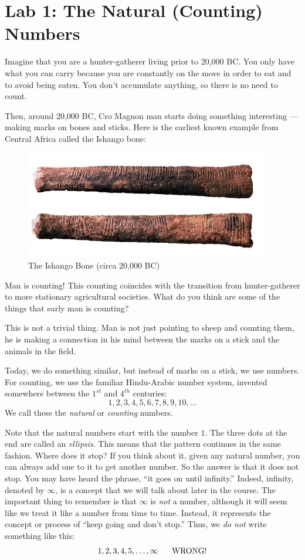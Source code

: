 \documentclass[letterpaper,12pt,fleqn]{article}
\begin{document}
\section*{Lab 1: The Natural (Counting) Numbers}

Imagine that you are a hunter-gatherer living prior to 20,000 BC. You only have what you
can carry because you are constantly on the move in order to eat and to avoid being
eaten. You don't accumulate anything, so there is no need to count.

Then, around 20,000 BC, Cro Magnon man starts doing something interesting --- making
marks on bones and sticks. Here is the earliest known example from Central Africa called
the Ishango bone:

\begin{figure}[h]
  \centering
  \includegraphics{ishango_bone.jpg}
  \caption*{The Ishango Bone (circa 20,000 BC)}
\end{figure}

Man is counting! This counting coincides with the transition from hunter-gatherer to more
stationary agricultural societies.  What do you think are some of the things that early
man is counting?

This is not a trivial thing. Man is not just pointing to sheep and counting them, he is
making a connection in his mind between the marks on a stick and the animals in the
field.

Today, we do something similar, but instead of marks on a stick, we use numbers. For
counting, we use the familiar Hindu-Arabic number system, invented somewhere between the
$1^{st}$ and $4^{th}$ centuries:
\[1, 2, 3, 4, 5, 6, 7, 8, 9, 10, \ldots\]
We call these the \emph{natural} or \emph{counting} numbers.

Note that the natural numbers start with the number $1$. The three dots at the end are
called an \emph{ellipsis}. This means that the pattern continues in the same fashion.
Where does it stop? If you think about it, given any natural number, you can always add
one to it to get another number. So the answer is that it does not stop. You may have
heard the phrase, ``it goes on until infinity.'' Indeed, infinity, denoted by $\infty$,
is a concept that we will talk about later in the course. The important thing to
remember is that $\infty$ is \emph{not} a number, although it will seem like we treat it
like a number from time to time. Instead, it represents the concept or process of
``keep going and don't stop.'' Thus, we \emph{do not} write something like this:
\[1, 2, 3, 4, 5, \ldots, \infty\hspace{4ex}\mbox{WRONG!}\]
\end{document}
